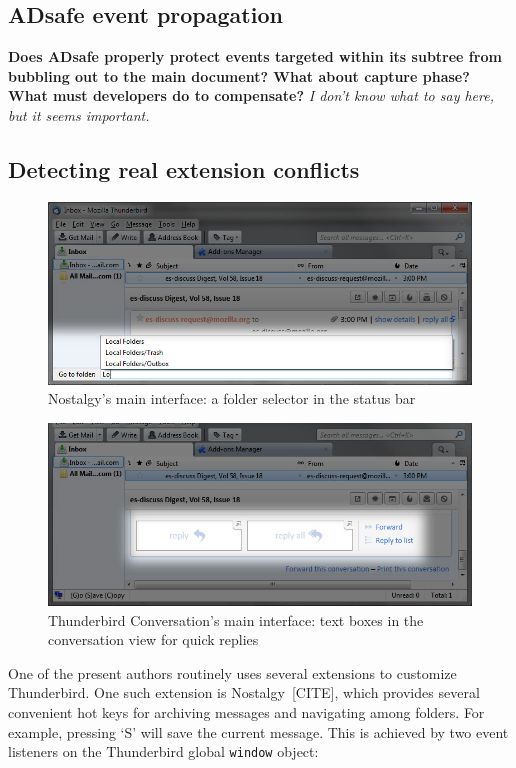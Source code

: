 \documentclass[letterpaper,10pt,twocolumn]{article}
\newcommand{\quot}{\mbox{\tt\char'042}}
\newcommand{\wild}{\mbox{\tt\char'137}}
\newcommand{\impl}[1]{{\def\_{\wild}\def\"{\quot}\tt#1}}
\begin{document}
\subsection{ADsafe event propagation} \textbf{Does ADsafe properly
  protect events targeted within its subtree from bubbling out to the
  main document?  What about capture phase?  What must developers do
  to compensate?} \emph{I don't know what to say here, but it seems
  important.}
\lipsum[4-6]

\subsection{Detecting real extension conflicts} 
\begin{figure}
  \includegraphics[width=\columnwidth]{nostalgy}
  \caption{Nostalgy's main interface: a folder selector in the status
    bar}
  \label{fig:nostalgy-screenshot}
\end{figure}
\begin{figure}
  \includegraphics[width=\columnwidth]{conversations}
  \caption{Thunderbird Conversation's main interface: text boxes in
    the conversation view for quick replies}
  \label{fig:conversation-screenshot}
\end{figure}
One of the present authors routinely uses several extensions to
customize Thunderbird.  One such extension is Nostalgy~[CITE], which
provides several convenient hot keys for archiving messages and
navigating among folders.  For example, pressing `S' will save the
current message.  This is achieved by two event listeners on
the Thunderbird global \impl{window} object:
\end{document}
